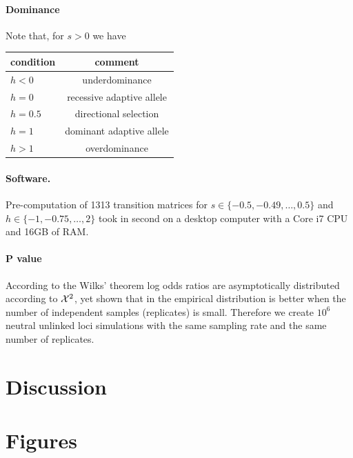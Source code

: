 \documentclass[11pt]{article}
\begin{document}
\paragraph{Dominance}
Note that, for $s>0$ we have \cite{}  
\begin{center}
	\begin{tabular}{l|c}
		condition & comment\\
		\hline
		$h<0$ &  underdominance\\
		$h=0$ & recessive adaptive allele\\
		$h=0.5$ & directional selection\\
		$h=1$&	dominant adaptive allele	\\
		$h>1$ &overdominance
		\end{tabular}
		\end{center}
		
\paragraph{Software.}
Pre-computation of 1313 transition matrices for $s\in\{-0.5,-0.49,\ldots,0.5 \}$ and $h\in \{-1,-0.75,\ldots,2\}$ took in second on a desktop computer with a Core i7 CPU and 16GB of RAM.


\paragraph{P value}
According to the Wilks’ theorem \cite{}  log odds ratios are asymptotically distributed according to ${\cal X}^2$, yet \cite{feder2014Identifying} shown that in the empirical distribution is better when the number of independent samples (replicates) is small. Therefore we create $10^6$ neutral unlinked loci simulations with the same sampling rate and the same number of replicates.







\section{Discussion}




\section{Figures}
\end{document}
